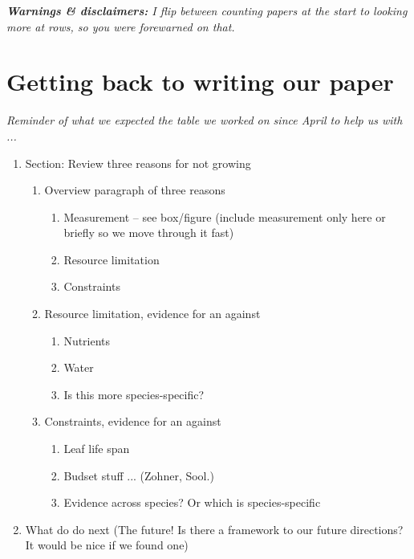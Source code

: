 \documentclass[11pt]{article}
\begin{document}
\emph{{\bf Warnings \& disclaimers:}
I flip between counting papers at the start to looking more at rows, so you were forewarned on that. }




\section{Getting back to writing our paper}

\emph{Reminder of what we expected the table we worked on since April to help us with ...}
\begin{enumerate}
\item Section: Review three reasons for not growing 
\begin{enumerate} 
\item Overview paragraph of three reasons
\begin{enumerate} 
\item Measurement -- see box/figure  (include measurement only here or briefly so we move through it fast)
\item Resource limitation
\item Constraints
\end{enumerate}
\item Resource limitation, evidence for an against 
\begin{enumerate}
\item Nutrients
\item Water
\item Is this more species-specific?
\end{enumerate}
\item Constraints, evidence for an against 
\begin{enumerate}
\item Leaf life span
\item Budset stuff ... (Zohner, Sool.)
\item Evidence across species? Or which is species-specific
\end{enumerate}
\end{enumerate}
\item What do do next (The future! Is there a framework to our future directions? It would be nice if we found one) 
\end{enumerate}
\end{document}
